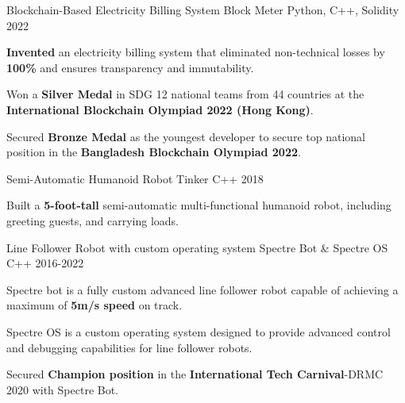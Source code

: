

\begin{cventries}

  \cventry
    {Blockchain-Based Electricity Billing System } %
    {Block Meter} %
    {Python, C++, Solidity} %
    {2022} %
    {
      \begin{cvitems} %
        \item {\textbf{Invented} an electricity billing system that eliminated non-technical losses by \textbf{100\%} and ensures transparency and immutability.}
        \item {Won a \textbf{Silver Medal} in SDG 12 national teams from 44 countries at the \textbf{International Blockchain Olympiad 2022 (Hong Kong)}.}
        \item {Secured \textbf{Bronze Medal} as the youngest developer to secure top national position in the \textbf{Bangladesh Blockchain Olympiad 2022}.}
      \end{cvitems}
    }

  \cventry
    {Semi-Automatic Humanoid Robot} %
    {Tinker} %
    {C++} %
    {2018} %
    {
      \begin{cvitems} %
        \item { Built a \textbf{5-foot-tall} semi-automatic multi-functional humanoid robot, including greeting guests, and carrying loads.}
      \end{cvitems}
    }

  \cventry
    {Line Follower Robot with custom operating system} %
    {Spectre Bot \& Spectre OS} %
    {C++} %
    {2016-2022} %
    {
      \begin{cvitems} %
        \item {Spectre bot is a fully custom advanced line 
        follower robot capable of achieving a maximum of \textbf{5m/s speed} on track.}
        \item {Spectre OS is a custom operating system designed to provide advanced control and 
        debugging capabilities for line follower robots.}
        \item {Secured \textbf{Champion position} in the \textbf{International Tech Carnival}-DRMC 2020 with Spectre Bot.}
      \end{cvitems}
    }

\end{cventries}
